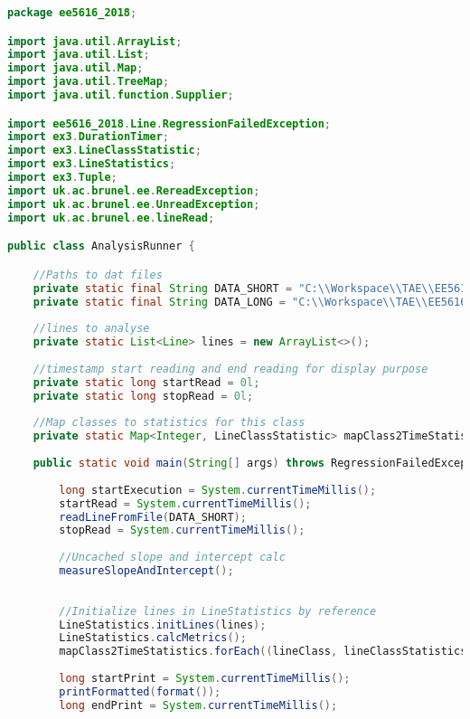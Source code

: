 \begin{lstlisting}[language=java,
    label=lst:analysisrunner,
    caption=Starter class for analysis with main()
]
package ee5616_2018;

import java.util.ArrayList;
import java.util.List;
import java.util.Map;
import java.util.TreeMap;
import java.util.function.Supplier;

import ee5616_2018.Line.RegressionFailedException;
import ex3.DurationTimer;
import ex3.LineClassStatistic;
import ex3.LineStatistics;
import ex3.Tuple;
import uk.ac.brunel.ee.RereadException;
import uk.ac.brunel.ee.UnreadException;
import uk.ac.brunel.ee.lineRead;

public class AnalysisRunner {

	//Paths to dat files
	private static final String DATA_SHORT = "C:\\Workspace\\TAE\\EE5616\\data_short.dat";
	private static final String DATA_LONG = "C:\\Workspace\\TAE\\EE5616\\data_long.dat";
	
	//lines to analyse
	private static List<Line> lines = new ArrayList<>();
	
	//timestamp start reading and end reading for display purpose
	private static long startRead = 0l;
	private static long stopRead = 0l;
	
	//Map classes to statistics for this class
	private static Map<Integer, LineClassStatistic> mapClass2TimeStatistics = new TreeMap<>();
	
	public static void main(String[] args) throws RegressionFailedException, UnreadException, RereadException {	
		
		long startExecution = System.currentTimeMillis();
		startRead = System.currentTimeMillis();
		readLineFromFile(DATA_SHORT);
		stopRead = System.currentTimeMillis();
		
		//Uncached slope and intercept calc
		measureSlopeAndIntercept();
		
		
		//Initialize lines in LineStatistics by reference
		LineStatistics.initLines(lines);
		LineStatistics.calcMetrics();
		mapClass2TimeStatistics.forEach((lineClass, lineClassStatistics) -> lineClassStatistics.calcAvgs());
		
		long startPrint = System.currentTimeMillis();
		printFormatted(format());
		long endPrint = System.currentTimeMillis();
		

\end{lstlisting}
